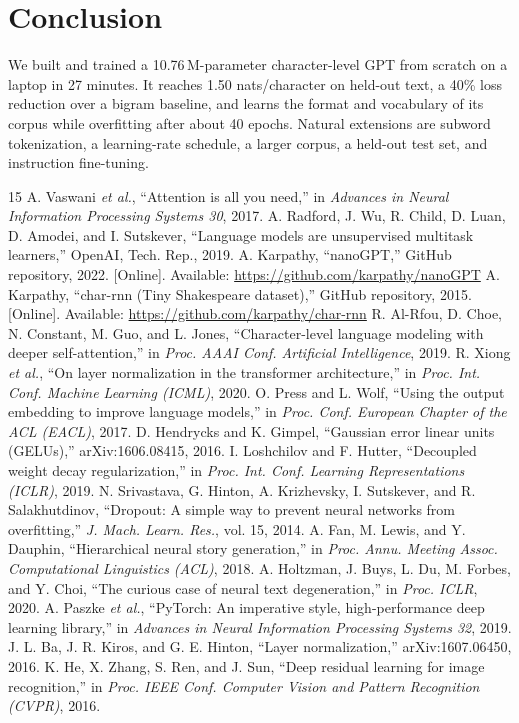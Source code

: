 \documentclass[conference]{IEEEtran}
\begin{document}
\section{Conclusion}
We built and trained a 10.76\,M-parameter character-level GPT from scratch on a laptop in 27 minutes. It reaches 1.50 nats/character on
held-out text, a 40\% loss reduction over a bigram baseline, and learns the format and vocabulary of its corpus while overfitting after
about 40 epochs. Natural extensions are subword tokenization, a learning-rate schedule, a larger corpus, a held-out test set, and
instruction fine-tuning.

\begin{thebibliography}{15}
 A. Vaswani \emph{et al.}, ``Attention is all you need,'' in \emph{Advances in Neural Information Processing Systems 30}, 2017.
 A. Radford, J. Wu, R. Child, D. Luan, D. Amodei, and I. Sutskever, ``Language models are unsupervised multitask learners,'' OpenAI, Tech. Rep., 2019.
 A. Karpathy, ``nanoGPT,'' GitHub repository, 2022. [Online]. Available: \url{https://github.com/karpathy/nanoGPT}
 A. Karpathy, ``char-rnn (Tiny Shakespeare dataset),'' GitHub repository, 2015. [Online]. Available: \url{https://github.com/karpathy/char-rnn}
 R. Al-Rfou, D. Choe, N. Constant, M. Guo, and L. Jones, ``Character-level language modeling with deeper self-attention,'' in \emph{Proc. AAAI Conf. Artificial Intelligence}, 2019.
 R. Xiong \emph{et al.}, ``On layer normalization in the transformer architecture,'' in \emph{Proc. Int. Conf. Machine Learning (ICML)}, 2020.
 O. Press and L. Wolf, ``Using the output embedding to improve language models,'' in \emph{Proc. Conf. European Chapter of the ACL (EACL)}, 2017.
 D. Hendrycks and K. Gimpel, ``Gaussian error linear units (GELUs),'' arXiv:1606.08415, 2016.
 I. Loshchilov and F. Hutter, ``Decoupled weight decay regularization,'' in \emph{Proc. Int. Conf. Learning Representations (ICLR)}, 2019.
 N. Srivastava, G. Hinton, A. Krizhevsky, I. Sutskever, and R. Salakhutdinov, ``Dropout: A simple way to prevent neural networks from overfitting,'' \emph{J. Mach. Learn. Res.}, vol. 15, 2014.
 A. Fan, M. Lewis, and Y. Dauphin, ``Hierarchical neural story generation,'' in \emph{Proc. Annu. Meeting Assoc. Computational Linguistics (ACL)}, 2018.
 A. Holtzman, J. Buys, L. Du, M. Forbes, and Y. Choi, ``The curious case of neural text degeneration,'' in \emph{Proc. ICLR}, 2020.
 A. Paszke \emph{et al.}, ``PyTorch: An imperative style, high-performance deep learning library,'' in \emph{Advances in Neural Information Processing Systems 32}, 2019.
 J. L. Ba, J. R. Kiros, and G. E. Hinton, ``Layer normalization,'' arXiv:1607.06450, 2016.
 K. He, X. Zhang, S. Ren, and J. Sun, ``Deep residual learning for image recognition,'' in \emph{Proc. IEEE Conf. Computer Vision and Pattern Recognition (CVPR)}, 2016.
\end{thebibliography}
\end{document}
